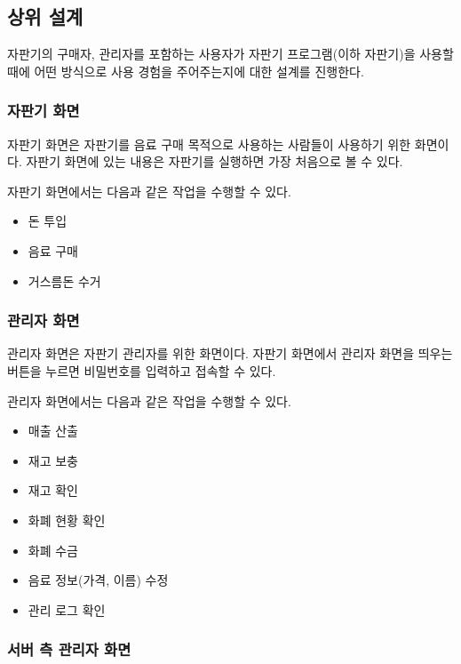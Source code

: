 \documentclass{oblivoir}
\begin{document}
    \subsection{상위 설계}

    자판기의 구매자, 관리자를 포함하는 사용자가
    자판기 프로그램(이하 자판기)을 사용할 때에
    어떤 방식으로 사용 경험을 주어주는지에 대한 설계를 진행한다.

    \subsubsection{자판기 화면}

    자판기 화면은 자판기를 음료 구매 목적으로 사용하는 사람들이
    사용하기 위한 화면이다.
    자판기 화면에 있는 내용은 자판기를 실행하면 가장 처음으로 볼 수 있다.

    자판기 화면에서는 다음과 같은 작업을 수행할 수 있다.
    \begin{itemize}
        \item 돈 투입
        \item 음료 구매
        \item 거스름돈 수거
    \end{itemize}

    \subsubsection{관리자 화면}

    관리자 화면은 자판기 관리자를 위한 화면이다.
    자판기 화면에서 관리자 화면을 띄우는 버튼을 누르면
    비밀번호를 입력하고 접속할 수 있다.

    관리자 화면에서는 다음과 같은 작업을 수행할 수 있다.
    \begin{itemize}
        \item 매출 산출
        \item 재고 보충
        \item 재고 확인
        \item 화폐 현황 확인
        \item 화폐 수금
        \item 음료 정보(가격, 이름) 수정
        \item 관리 로그 확인
    \end{itemize}

    \subsubsection{서버 측 관리자 화면}
\end{document}
